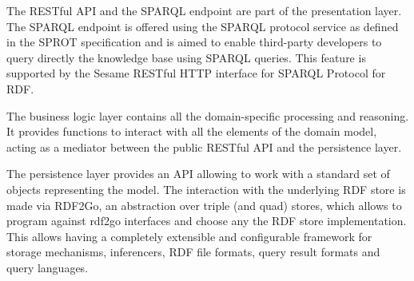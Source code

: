 The RESTful API and the SPARQL endpoint are part of the presentation layer. The SPARQL endpoint is offered using the SPARQL protocol service as defined in the SPROT specification \cite{sprot} and is aimed to enable third-party developers to query directly the knowledge base using SPARQL queries. This feature is supported by the Sesame RESTful HTTP interface for SPARQL Protocol for RDF.

The business logic layer contains all the domain-specific processing and reasoning. It provides functions to interact with all the elements of the domain model,
acting as a mediator between the public RESTful API and the persistence layer.

The persistence layer provides an API allowing to work with a standard set of objects representing the model. The interaction with the underlying RDF store is made via RDF2Go, an abstraction over triple (and quad) stores, which allows to program against rdf2go interfaces and choose any the RDF store implementation. This allows having a completely extensible and configurable framework for storage mechanisms, inferencers, RDF file formats, query result formats and query languages.

% 


